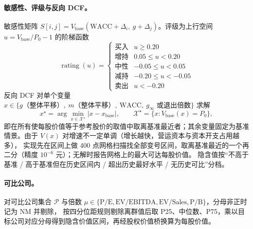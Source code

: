 \paragraph{敏感性、评级与反向 DCF。}
敏感性矩阵 $S[i,j]=V_{\text{base}}(\text{WACC}+\Delta_i,\ g+\Delta_j)$。评级为上行空间 $u=V_{\text{base}}/P_0-1$ 的阶梯函数
\begin{equation}
\operatorname{rating}(u)=\begin{cases}
\text{买入} & u\ge 0.20\\ \text{增持} & 0.05\le u<0.20\\ \text{中性} & -0.05\le u<0.05\\ \text{减持} & -0.20\le u<-0.05\\ \text{卖出} & u<-0.20
\end{cases}
\label{eq:prob-rating}
\end{equation}
反向 DCF 对单个变量 $x\in\{g\text{（整体平移）},\ m\text{（整体平移）},\ \text{WACC},\ g_{\infty}\text{ 或退出倍数}\}$ 求解
\begin{equation}
x^\star=\arg\min_{x\in\mathcal{X}^\star}|x-x_{\text{base}}|,\qquad \mathcal{X}^\star=\{x : V_{\text{base}}(x)=P_0\},
\label{eq:prob-rdcf}
\end{equation}
即在所有使每股价值等于参考股价的取值中取离基准最近者；其余变量固定为基准情景。由于 $V(x)$ 对增速不一定单调（增长越快，营运资本与资本开支占用越多），
实现先在区间上做 400 点网格扫描找全部变号区间，取离基准最近的一个再二分（精度 $10^{-6}$ 元）；无解时报告网格上的最大可达每股价值。
隐含值按“不高于基准 / 高于基准但在历史区间内 / 超出历史最好水平 / 无历史可比”分档。

\paragraph{可比公司。}
对可比公司集合 $\mathcal{P}$ 与倍数 $\mu\in\{\text{P/E},\text{EV/EBITDA},\text{EV/Sales},\text{P/B}\}$，分母非正时记为 NM 并剔除，
按四分位距规则剔除离群值后取 P25、中位数、P75，乘以目标公司对应分母得到隐含价值区间，再经股权价值桥换算为每股价值。


